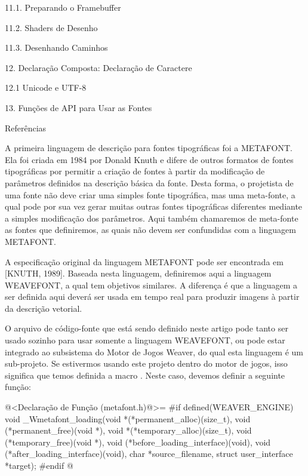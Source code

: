 11.1. Preparando o Framebuffer 

11.2. Shaders de Desenho 

11.3. Desenhando Caminhos 

12. Declaração Composta: Declaração de Caractere 

12.1 Unicode e UTF-8 

13. Funções de API para Usar as Fontes 

Referências 


A primeira linguagem de descrição para fontes tipográficas foi a
METAFONT. Ela foi criada em 1984 por Donald Knuth e difere de outros
formatos de fontes tipográficas por permitir a criação de fontes à
partir da modificação de parâmetros definidos na descrição básica da
fonte. Desta forma, o projetista de uma fonte não deve criar uma
simples fonte tipográfica, mas uma meta-fonte, a qual pode por sua vez
gerar muitas outras fontes tipográficas diferentes mediante a simples
modificação dos parâmetros.  Aqui também chamaremos de meta-fonte as
fontes que definiremos, as quais não devem ser confundidas com a
linguagem METAFONT.

A especificação original da linguagem METAFONT pode ser encontrada em
[KNUTH, 1989].  Baseada nesta linguagem, definiremos aqui a linguagem
WEAVEFONT, a qual tem objetivos similares. A diferença é que a
linguagem a ser definida aqui deverá ser usada em tempo real para
produzir imagens à partir da descrição vetorial.

O arquivo de código-fonte que está sendo definido neste artigo pode
tanto ser usado sozinho para usar somente a linguagem WEAVEFONT, ou
pode estar integrado ao subsistema do Motor de Jogos Weaver, do qual
esta linguagem é um sub-projeto. Se estivermos usando este projeto
dentro do motor de jogos, isso significa que temos definida a
macro . Neste caso, devemos definir a
seguinte função:

\iniciocodigo
@<Declaração de Função (metafont.h)@>=
#if defined(WEAVER_ENGINE)
void _Wmetafont_loading(void *(*permanent_alloc)(size_t),
                        void (*permanent_free)(void *),
                        void *(*temporary_alloc)(size_t),
                        void (*temporary_free)(void *),
                        void (*before_loading_interface)(void),
                        void (*after_loading_interface)(void),
                        char *source_filename,
                        struct user_interface *target);
#endif
@
\fimcodigo

